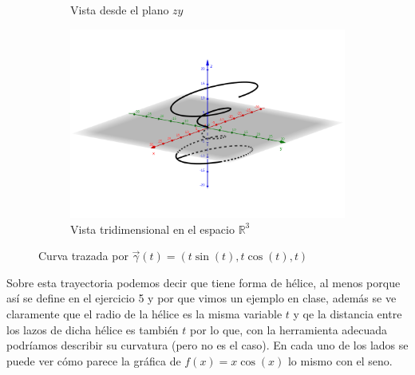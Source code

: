 \documentclass[letterpaper]{article}
\newcommand{\R}{\mathds{R}}
\renewcommand{\*}{\cdot}
\theoremstyle{definition}
\begin{document}
\begin{figure}[h!]
\begin{subfigure}[b]{0.3\linewidth}
	\caption{Vista desde el plano $ zy $}
\end{subfigure}
\begin{subfigure}[b]{0.5\linewidth}
	\includegraphics[width=\textwidth]{img/Proyecto4_10.png}
	\caption{Vista tridimensional en el espacio $ \R^3 $}
\end{subfigure}
	\caption{Curva trazada por $ \vec{\gamma}(t)= (t\sin(t), t\cos(t), t)$}
\end{figure}
Sobre esta trayectoria podemos decir que tiene forma de hélice, al menos porque así se define en el ejercicio 5 y por que vimos un ejemplo en clase, además se ve claramente que el radio de la hélice es la misma variable $ t $ y qe la distancia entre los lazos de dicha hélice es también $ t $ por lo que, con la herramienta adecuada podríamos describir su curvatura (pero no es el caso). En cada uno de los lados se puede ver cómo parece la gráfica de $ f(x) = x\cos(x)$ lo mismo con el seno.
\end{document}
